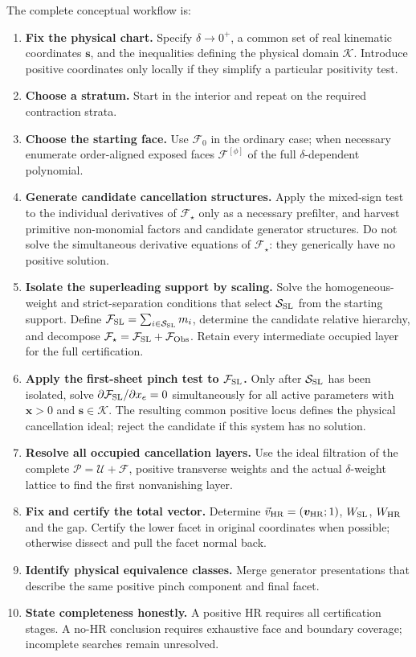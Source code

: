 \documentclass[a4paper,11pt]{article}
\newcommand{\x}{\boldsymbol{x}}
\newcommand{\s}{\boldsymbol{s}}
\newcommand{\K}{\mathcal K}
\newcommand{\HR}{\mathrm{HR}}
\newcommand{\FSL}{\mathcal F_{\rm SL}}
\newcommand{\SSL}{\mathcal S_{\rm SL}}
\newcommand{\FObs}{\mathcal F_{\rm Obs}}
\newcommand{\WSL}{W_{\rm SL}}
\newcommand{\WHR}{W_{\rm HR}}
\newcommand{\vHR}{\vec v_{\rm HR}}
\begin{document}
The complete conceptual workflow is:
\begin{enumerate}[label=\textbf{\arabic*.},leftmargin=*]
\item \textbf{Fix the physical chart.}
      Specify \(\delta\to0^+\), a common set of real kinematic coordinates
      \(\s\), and the inequalities defining the physical domain \(\K\).
      Introduce positive coordinates only locally if they simplify a
      particular positivity test.
\item \textbf{Choose a stratum.}
      Start in the interior and repeat on the required contraction strata.
\item \textbf{Choose the starting face.}
      Use \(\mathcal F_0\) in the ordinary case; when necessary enumerate
      order-aligned exposed faces \(\mathcal F^{[\phi]}\) of the full
      \(\delta\)-dependent polynomial.
\item \textbf{Generate candidate cancellation structures.}
      Apply the mixed-sign test to the individual derivatives of
      \(\mathcal F_\star\) only as a necessary prefilter, and harvest
      primitive non-monomial factors and candidate generator structures.
      Do not solve the simultaneous derivative equations of
      \(\mathcal F_\star\): they generically have no positive solution.
\item \textbf{Isolate the superleading support by scaling.}
      Solve the homogeneous-weight and strict-separation conditions that
      select \(\SSL\) from the starting support.  Define
      \(\FSL=\sum_{i\in\SSL}m_i\), determine the candidate relative
      hierarchy, and decompose
      \(\mathcal F_\star=\FSL+\FObs\).  Retain every intermediate occupied
      layer for the full certification.
\item \textbf{Apply the first-sheet pinch test to \(\FSL\).}
      Only after \(\SSL\) has been isolated, solve
      \(\partial\FSL/\partial x_e=0\) simultaneously for all active
      parameters with \(\x>0\) and \(\s\in\K\).  The resulting common
      positive locus defines the physical cancellation ideal; reject the
      candidate if this system has no solution.
\item \textbf{Resolve all occupied cancellation layers.}
      Use the ideal filtration of the complete
      \(\mathcal P=\mathcal U+\mathcal F\), positive transverse weights and
      the actual \(\delta\)-weight lattice to find the first nonvanishing
      layer.
\item \textbf{Fix and certify the total vector.}
      Determine \(\vHR=(\boldsymbol v_{\HR};1)\), \(\WSL\), \(\WHR\) and the
      gap.  Certify the lower facet in original coordinates when possible;
      otherwise dissect and pull the facet normal back.
\item \textbf{Identify physical equivalence classes.}
      Merge generator presentations that describe the same positive pinch
      component and final facet.
\item \textbf{State completeness honestly.}
      A positive HR requires all certification stages.  A no-HR conclusion
      requires exhaustive face and boundary coverage; incomplete searches
      remain unresolved.
\end{enumerate}
\end{document}
